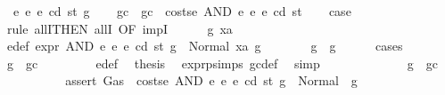 \begin{isabellebody}
\ {\isacharparenleft}{\kern0pt}{}{}\ e{}\ e{}\ e\ cd\ st\ g{\isacharparenright}{\kern0pt}\isanewline
\ \ \isamarkupfalse%
\ gc\ \ {\isachardoublequoteopen}gc\ {\isacharequal}{\kern0pt}\ costs\isactrlsub e\ {\isacharparenleft}{\kern0pt}AND\ e{}\ e{}{\isacharparenright}{\kern0pt}\ e\ cd\ st{\isachardoublequoteclose}\isanewline
\ \ \isamarkupfalse%
\ {\isacharquery}{\kern0pt}case\isanewline
\ \ \isamarkupfalse%
\ {\isacharparenleft}{\kern0pt}rule\ allI{\isacharbrackleft}{\kern0pt}THEN\ allI{\isacharcomma}{\kern0pt}\ OF\ impI{\isacharbrackright}{\kern0pt}{\isacharparenright}{\kern0pt}\isanewline
\ \ \ \ \isamarkupfalse%
\ g{}\ xa\ \isamarkupfalse%
\ e{\isacharunderscore}{\kern0pt}def{\isacharcolon}{\kern0pt}\ {\isachardoublequoteopen}expr\ {\isacharparenleft}{\kern0pt}AND\ e{}\ e{}{\isacharparenright}{\kern0pt}\ e\ cd\ st\ g\ {\isacharequal}{\kern0pt}\ Normal\ {\isacharparenleft}{\kern0pt}xa{\isacharcomma}{\kern0pt}\ g{}{\isacharparenright}{\kern0pt}{\isachardoublequoteclose}\isanewline
\ \ \ \ \isamarkupfalse%
\ \isamarkupfalse%
\ {\isachardoublequoteopen}g{}\ {\isasymle}\ g{\isachardoublequoteclose}\isanewline
\ \ \ \ \isamarkupfalse%
\ {\isacharparenleft}{\kern0pt}cases{\isacharparenright}{\kern0pt}\isanewline
\ \ \ \ \ \ \isamarkupfalse%
\ {\isachardoublequoteopen}g\ {\isasymle}\ gc{\isachardoublequoteclose}\isanewline
\ \ \ \ \ \ \isamarkupfalse%
\ {}{}{\isacharparenleft}{\kern0pt}{}{\isacharparenright}{\kern0pt}\ e{\isacharunderscore}{\kern0pt}def\ \isamarkupfalse%
\ {\isacharquery}{\kern0pt}thesis\ \isamarkupfalse%
\ expr{\isachardot}{\kern0pt}psimps{\isacharparenleft}{\kern0pt}{}{}{\isacharparenright}{\kern0pt}\ gc{\isacharunderscore}{\kern0pt}def\ \isamarkupfalse%
\ simp\isanewline
\ \ \ \ \isamarkupfalse%
\isanewline
\ \ \ \ \ \ \isamarkupfalse%
\ {\isachardoublequoteopen}{\isasymnot}\ g\ {\isasymle}\ gc{\isachardoublequoteclose}\isanewline
\ \ \ \ \ \ \isamarkupfalse%
\ \isamarkupfalse%
\ {\isacharasterisk}{\kern0pt}{\isacharcolon}{\kern0pt}\ {\isachardoublequoteopen}assert\ Gas\ {\isacharparenleft}{\kern0pt}{\isacharparenleft}{\kern0pt}{\isacharless}{\kern0pt}{\isacharparenright}{\kern0pt}\ {\isacharparenleft}{\kern0pt}costs\isactrlsub e\ {\isacharparenleft}{\kern0pt}AND\ e{}\ e{}{\isacharparenright}{\kern0pt}\ e\ cd\ st{\isacharparenright}{\kern0pt}{\isacharparenright}{\kern0pt}\ g\ {\isacharequal}{\kern0pt}\ Normal\ {\isacharparenleft}{\kern0pt}{\isacharparenleft}{\kern0pt}{\isacharparenright}{\kern0pt}{\isacharcomma}{\kern0pt}\ g{\isacharparenright}{\kern0pt}{\isachardoublequoteclose}\ \isamarkupfalse%

\end{isabellebody}
